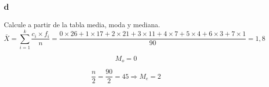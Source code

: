 \documentclass{templateNote}
\begin{document}
\subsubsection{d}
\indent
Calcule a partir de la tabla media, moda y mediana.
\[
    \bar{X} = \sum_{i=1}^{k} \frac{c_i \times f_i}{n} = \frac{0 \times 26 + 1 \times 17 + 2 \times 21 + 3 \times 11 + 4 \times 7 + 5 \times 4 + 6 \times 3 + 7 \times 1}{90} = 1,8
\]

\[
    M_o = 0
\]

\[
    \frac{n}{2} = \frac{90}{2} = 45 \Rightarrow M_e = 2
\]
\end{document}
